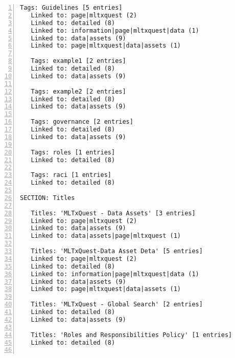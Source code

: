 \documentclass[10pt]{article}
\begin{document}
{\begin{lstlisting}[numbers=left,basicstyle=\ttfamily\footnotesize, frame=none]
   Tags: Guidelines [5 entries]                                       Tags: metrics [1 entries]
   Linked to: page|mltxquest (2)                                      Linked to: detailed (8)
   Linked to: detailed (8)        
   Linked to: information|page|mltxquest|data (1)                     Tags: Historical data [1 entries]
   Linked to: data|assets (9)                                         Linked to: detailed (8)
   Linked to: page|mltxquest|data|assets (1)        
                                                                      Tags: Security [1 entries]
   Tags: example1 [2 entries]                                         Linked to: information|assets (1)
   Linked to: detailed (8)        
   Linked to: data|assets (9)                                         Tags: privacy [1 entries]
                                                                      Linked to: data|assets (9)
   Tags: example2 [2 entries]        
   Linked to: detailed (8)                                            Tags: Steward [1 entries]
   Linked to: data|assets (9)                                         Linked to: data|assets (9)
           
   Tags: governance [2 entries]                                       Tags: policy [1 entries]
   Linked to: detailed (8)                                            Linked to: data|assets (9)
   Linked to: data|assets (9)        
                                                                      Tags: owner [1 entries]
   Tags: roles [1 entries]                                            Linked to: data|assets (9)
   Linked to: detailed (8)        
                                                                      Tags: badge [1 entries]
   Tags: raci [1 entries]                                             Linked to: data|assets (9)
   Linked to: detailed (8)    
	
SECTION: Titles

   Titles: 'MLTxQuest - Data Assets' [3 entries]
   Linked to: page|mltxquest (2)
   Linked to: data|assets (9)
   Linked to: data|assets|page|mltxquest (1)

   Titles: 'MLTxQuest-Data Asset Deta' [5 entries]
   Linked to: page|mltxquest (2)
   Linked to: detailed (8)
   Linked to: information|page|mltxquest|data (1)
   Linked to: data|assets (9)
   Linked to: page|mltxquest|data|assets (1)

   Titles: 'MLTxQuest - Global Search' [2 entries]
   Linked to: detailed (8)
   Linked to: data|assets (9)

   Titles: 'Roles and Responsibilities Policy' [1 entries]
   Linked to: detailed (8)


\end{lstlisting}}
\end{document}
